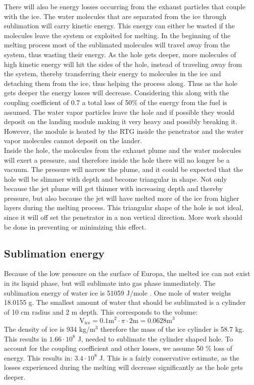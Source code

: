 \noindent
There will also be energy losses occurring from the exhaust particles that couple with the ice. The water molecules that are separated from the ice through sublimation will carry kinetic energy. This energy can either be wasted if the molecules leave the system or exploited for melting. In the beginning of the melting process most of the sublimated molecules will travel away from the system, thus wasting their energy. As the hole gets deeper, more molecules of high kinetic energy will hit the sides of the hole, instead of traveling away from the system, thereby transferring their energy to molecules in the ice and detaching them from the ice, thus helping the process along. Thus as the hole gets deeper the energy losses will decrease. Considering this along with the coupling coefficient of 0.7 a total loss of 50$\%$ of the energy from the fuel is assumed. The water vapor particles leave the hole and if possible they would deposit on the landing module making it very heavy and possibly breaking it. However, the module is heated by the RTG inside the penetrator and the water vapor molecules cannot deposit on the lander.\\
Inside the hole, the molecules from the exhaust plume and the water molecules will exert a pressure, and therefore inside the hole there will no longer be a vacuum. The pressure will narrow the plume, and it could be expected that the hole will be slimmer with depth and become triangular in shape. Not only because the jet plume will get thinner with increasing depth and thereby pressure, but also because the jet will have melted more of the ice from higher layers during the melting process. This triangular shape of the hole is not ideal, since it will off set the penetrator in a non vertical direction. More work should be done in preventing or minimizing this effect.

\subsection{Sublimation energy}

Because of the low pressure on the surface of Europa, the melted ice can not exist in its liquid phase, but will sublimate into gas phase immediately. The sublimation energy of water ice is 51059 J/mole \cite{water_prop}. One mole of water weighs 18.0155 g. The smallest amount of water that should be sublimated is a cylinder of 10 cm radius and 2 m depth. This corresponds to the volume:
\begin{equation}
\mathrm{V_{ice}}=0.1 \mathrm{m}^2 \cdot \pi \cdot 2 \mathrm{m} = 0.0628 \mathrm{m}^3
\end{equation}
The density of ice is 934 kg/m$^3$ therefore the mass of the ice cylinder is 58.7 kg. This results in $1.66\cdot 10^8$ J, needed to sublimate the cylinder shaped hole. To account for the coupling coefficient and other losses, we assume 50 \% loss of energy. This results in: $3.4 \cdot 10^8$ J. This is a fairly conservative estimate, as the losses experienced during the melting will decrease significantly as the hole gets deeper. 

